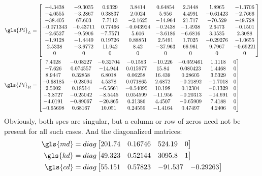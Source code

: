 \begin{align}
\gls{Pi}_L &= \begin{bmatrix}
 -4.3438 & -9.3035 &  0.9329 &  3.8414 & 0.64854 &  2.3448 &  1.8965 & -1.3706\\
 -4.0555 & -3.2867 & 0.38837 &  2.0024 &   5.956 &  4.4991 & -0.61423 & -2.7666\\
 -38.405 &  67.603 &  7.7113 & -2.1625 & -14.964 &  21.717 &  -70.529 & -49.728\\
 -0.071343 & -0.43711 & 0.77466 & -0.043924 & -0.2438 & -1.4938 & 2.6473 & -0.1501\\
 -2.6527 & -9.5906 & -7.7571 &   5.606 & -3.6186 & -6.6816 &   3.0535 &  2.3088\\
 -1.9128 & -1.4449 & 0.19726 & 0.88851 &  2.5491 &  1.7025 &   -0.29276 & -1.0655\\
  2.5338 & -3.6772 &  11.942 &    8.42 & -37.963 &  66.961  &  9.7967  &   -0.69221\\
  0   & 0 &   0 &   0   & 0   & 0 &   0 & 0
\end{bmatrix}\\
\gls{Pi}_R &= \begin{bmatrix}
7.4028 & -0.08227 & -0.32704 &  -0.1583 &  -10.226 & -0.059461 &   1.1118 & 0 \\
-7.626 & 0.074557 &  -14.944 & 0.015977 &    15.84 & 0.080423 &   1.4468 &  0 \\
8.9447 &  0.32858 &   6.8018 &  0.06258 &   16.439 &  0.28605 &   3.5329 &  0 \\
-0.68185 & -0.28094 &   4.5378 & 0.071865 &   2.6872 & -0.21892 &  -1.7018 & 0 \\
2.5002 &  0.18514 &  -6.5661 & -0.54095 &   10.198 &  0.12304 &  -0.1329 &  0 \\
-3.8727 & -0.25042 &  -8.5445 & 0.054599 &  -11.956 & -0.20313 &  -14.691 & 0 \\
-4.0191 & -0.89067 &  -20.865 &  0.21386 &   4.4507 & -0.65909 &   7.4188 & 0 \\
-0.65698 &  0.68167 &   10.051 &  0.24559 &  -1.4164 &  0.47497 &   4.2406 & 0
\end{bmatrix}
\end{align}
Obviously, both \glspl{spe} are singular, but a column or row of zeros 
need not be present for all such cases. And the diagonalized matrices:
\begin{align}
\gls{md} &= diag\begin{bmatrix}
 201.74  &   0.16746   &   524.19   &         0
\end{bmatrix}\\
\gls{kd} &= diag\begin{bmatrix}
     49.323  &   0.52144   &  3095.8     &    1
\end{bmatrix}\\
\gls{cd} &= diag\begin{bmatrix}
      55.151   &  0.57823  &     -91.537  &   - 0.29263
\end{bmatrix}
\end{align}
